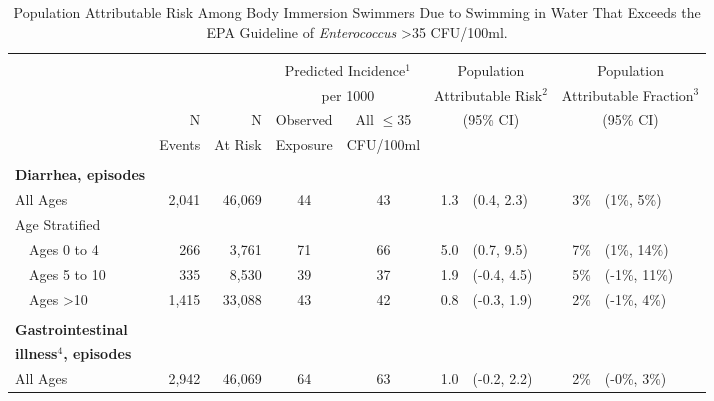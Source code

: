 \documentclass[12pt]{article}\usepackage[]{graphicx}\usepackage[]{color}
\begin{document}
\clearpage

\begin{table}[h!tb]
\begin{footnotesize}
\begin{center}
\begin{minipage}{0.8\textwidth}
\caption{Population Attributable Risk Among Body Immersion Swimmers Due to Swimming in Water That Exceeds the EPA Guideline of \textit{Enterococcus} >35 CFU/100ml.   \label{tab:ARwatexp}}
\end{minipage}
\begin{tabular}{l rr cc rl rl}
 & \\
 &  &  & \multicolumn{2}{c}{Predicted Incidence$^1$}  & \multicolumn{2}{c}{Population}        & \multicolumn{2}{c}{Population}    \\
 & &                     & \multicolumn{2}{c}{per 1000}             & \multicolumn{2}{c}{Attributable Risk$^2$} & \multicolumn{2}{c}{Attributable Fraction$^3$} \\
\cline{4-5}
 & N        & N          & Observed  & All $\leq$35                &  \multicolumn{2}{c}{(95\% CI)}        & \multicolumn{2}{c}{(95\% CI)}   \\
 &  Events  &  At Risk   & Exposure  & CFU/100ml  \\
\hline
& \\
\textbf{Diarrhea, episodes} \\
 All Ages & 2,041 & 46,069 & 44 & 43 & 1.3 & (0.4, 2.3) & 3\% & (1\%, 5\%) \\ 
  
Age Stratified \\
 ~~Ages 0 to 4 & 266 & 3,761 & 71 & 66 & 5.0 & (0.7, 9.5) & 7\% & (1\%, 14\%) \\ 
 ~~Ages 5 to 10 & 335 & 8,530 & 39 & 37 & 1.9 & (-0.4, 4.5) & 5\% & (-1\%, 11\%) \\ 
 ~~Ages >10 & 1,415 & 33,088 & 43 & 42 & 0.8 & (-0.3, 1.9) & 2\% & (-1\%, 4\%) \\ 
  
& \\
\textbf{Gastrointestinal} \\
\textbf{illness$^4$, episodes} \\
 All Ages & 2,942 & 46,069 & 64 & 63 & 1.0 & (-0.2, 2.2) & 2\% & (-0\%, 3\%) \\ 
  

\end{tabular}
\end{center}
\end{footnotesize}
\end{table}
\end{document}
